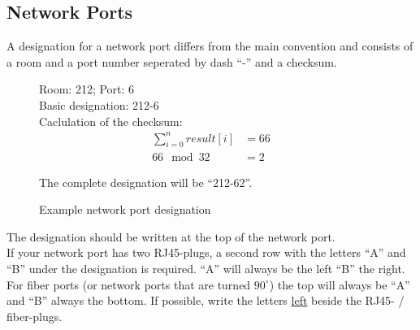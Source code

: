 %
%
%
%
%
%
%

\subsection{Network Ports}
\label{chap:con_netport}

A designation for a network port differs from the main convention and consists
of a room and a port number seperated by dash ``-'' and a checksum.

\begin{figure}[H]
	Room: 212; Port: 6 \\
	Basic designation: 212-6 \\

	Caclulation of the checksum:
	\begin{align*}
		\sum_{i=0}^{n} result[i] &= 66 \\
		66 \mod 32 &= 2
	\end{align*}

	The complete designation will be ``212-62''.

	\caption{Example network port designation}
\end{figure}

The designation should be written at the top of the network port. \\


If your network port has two RJ45-plugs, a second row with the letters ``A'' and
``B'' under the designation is required. ``A'' will always be the left ``B'' the
right. For fiber ports (or network ports that are turned $90^{\circ}$) the top
will always be ``A'' and ``B'' always the bottom. If possible, write the letters
\underline{left} beside the RJ45- / fiber-plugs. \\


